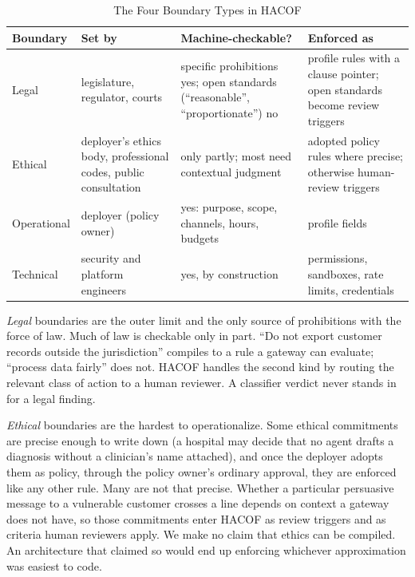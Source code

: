 \documentclass{ieeeaccess}
\newcommand{\hacof}{HACOF}
\begin{document}
\begin{table}[!t]
\caption{The Four Boundary Types in \hacof}
\label{tab:boundaries}
\centering
\footnotesize
\setlength{\tabcolsep}{3pt}
\begin{tabular}{>{\raggedright\arraybackslash}p{1.45cm}>{\raggedright\arraybackslash}p{1.7cm}>{\raggedright\arraybackslash}p{2.1cm}>{\raggedright\arraybackslash}p{1.9cm}}
\toprule
\rowcolor{darkblue!15}
\textbf{Boundary} & \textbf{Set by} & \textbf{Machine-checkable?} & \textbf{Enforced as} \\
\midrule
Legal & legislature, regulator, courts & specific prohibitions yes; open standards (``reasonable'', ``proportionate'') no & profile rules with a clause pointer; open standards become review triggers \\
\rowcolor{darkblue!5}
Ethical & deployer's ethics body, professional codes, public consultation & only partly; most need contextual judgment & adopted policy rules where precise; otherwise human-review triggers \\
Operational & deployer (policy owner) & yes: purpose, scope, channels, hours, budgets & profile fields \\
\rowcolor{darkblue!5}
Technical & security and platform engineers & yes, by construction & permissions, sandboxes, rate limits, credentials \\
\bottomrule
\end{tabular}
\end{table}

\textit{Legal} boundaries are the outer limit and the only source of prohibitions with the force of law. Much of law is checkable only in part. ``Do not export customer records outside the jurisdiction'' compiles to a rule a gateway can evaluate; ``process data fairly'' does not. \hacof{} handles the second kind by routing the relevant class of action to a human reviewer. A classifier verdict never stands in for a legal finding.

\textit{Ethical} boundaries are the hardest to operationalize. Some ethical commitments are precise enough to write down (a hospital may decide that no agent drafts a diagnosis without a clinician's name attached), and once the deployer adopts them as policy, through the policy owner's ordinary approval, they are enforced like any other rule. Many are not that precise. Whether a particular persuasive message to a vulnerable customer crosses a line depends on context a gateway does not have, so those commitments enter \hacof{} as review triggers and as criteria human reviewers apply. We make no claim that ethics can be compiled. An architecture that claimed so would end up enforcing whichever approximation was easiest to code.
\end{document}
